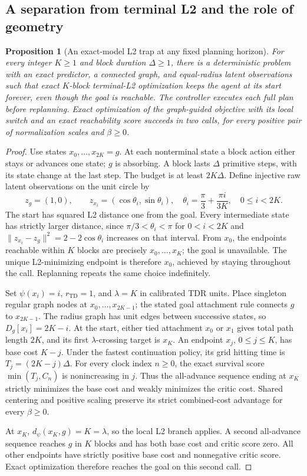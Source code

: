 \documentclass{article}
\newcommand{\Htd}{r_{\mathrm{TD}}}
\newcommand{\dd}{d_{\psi}}
\newtheorem{proposition}[theorem]{Proposition}
\theoremstyle{definition}
\theoremstyle{remark}
\begin{document}
\subsection{A separation from terminal L2 and the role of geometry}
\label{app:separation}
\begin{proposition}[An exact-model L2 trap at any fixed planning horizon]
\label{prop:l2-separation}
For every integer $K\ge1$ and block duration $\Delta\ge1$, there is a deterministic
problem with an exact predictor, a connected graph, and equal-radius latent observations
such that exact $K$-block terminal-L2 optimization keeps the agent at its start forever,
even though the goal is reachable. The controller executes each full plan before replanning.
Exact optimization of the graph-guided objective with
its local switch and an exact reachability score succeeds in two calls, for every
positive pair of normalization scales and $\beta\ge0$.
\end{proposition}
\begin{proof}
Use states $x_0,\ldots,x_{2K}=g$. At each nonterminal state a block action either
stays or advances one state; $g$ is absorbing. A block lasts $\Delta$ primitive
steps, with its state change at the last step. The budget is at least $2K\Delta$.
Define injective raw latent observations on the unit circle by
\[
 z_g=(1,0),\qquad
 z_{x_i}=(\cos\theta_i,\sin\theta_i),\quad
 \theta_i=\frac\pi3+\frac{\pi i}{3K},\quad 0\le i<2K.
\]
The start has squared L2 distance one from the goal. Every intermediate state has strictly
larger distance, since $\pi/3<\theta_i<\pi$ for $0<i<2K$ and
$\|z_{x_i}-z_g\|^2=2-2\cos\theta_i$ increases on that interval.
From $x_0$, the endpoints reachable within $K$ blocks are precisely
$x_0,\ldots,x_K$; the goal is unavailable. The unique L2-minimizing endpoint is
therefore $x_0$, achieved by staying throughout the call. Replanning repeats the
same choice indefinitely.

Set $\psi(x_i)=i$, $\Htd=1$, and $\lambda=K$ in calibrated TDR units.
Place singleton regular graph nodes at $x_0,\ldots,x_{2K-1}$; the stated goal
attachment rule connects $g$ to $x_{2K-1}$. The radius graph has unit edges between
successive states, so $D_g[x_i]=2K-i$. At the start, either tied attachment $x_0$
or $x_1$ gives total path length $2K$, and its first $\lambda$-crossing target is
$x_K$. An endpoint $x_j$, $0\le j\le K$, has base cost $K-j$.
Under the fastest continuation policy, its grid hitting time is
$T_j=(2K-j)\Delta$. For every clock index $n\ge0$, the exact survival score
$\min(T_j,C_n)$ is nonincreasing in $j$.
Thus the all-advance sequence ending at $x_K$ strictly minimizes the base cost
and weakly minimizes the critic cost. Shared centering and positive scaling preserve
its strict combined-cost advantage for every $\beta\ge0$.

At $x_K$, $\dd(x_K,g)=K=\lambda$, so the local L2 branch applies. A second
all-advance sequence reaches $g$ in $K$ blocks and has both base cost and critic
score zero. All other endpoints have strictly positive base cost and nonnegative
critic score. Exact optimization therefore reaches the goal on this second call.
\end{proof}
\end{document}
